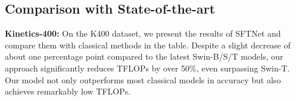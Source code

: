 \documentclass[conference,a4paper,english]{IEEEtran}[2015/08/26]
\begin{document}
\subsection{Comparison with State-of-the-art}
\textbf{Kinetics-400:} On the K400 dataset, we present the results of SFTNet and compare them with classical methods in the table. 
Despite a slight decrease of about one percentage point compared to the latest Swin-B/S/T models, 
our approach significantly reduces TFLOPs by over 50\%, even surpassing Swin-T. 
Our model not only outperforms most classical models in accuracy but also achieves remarkably low TFLOPs.

\begin{table}[ht]
  \centering
  \caption{Comparison with state-of-the-art methods on Kinetics dataset.}
  \label{tab:model_comparison}
  \end{table}
\end{document}

